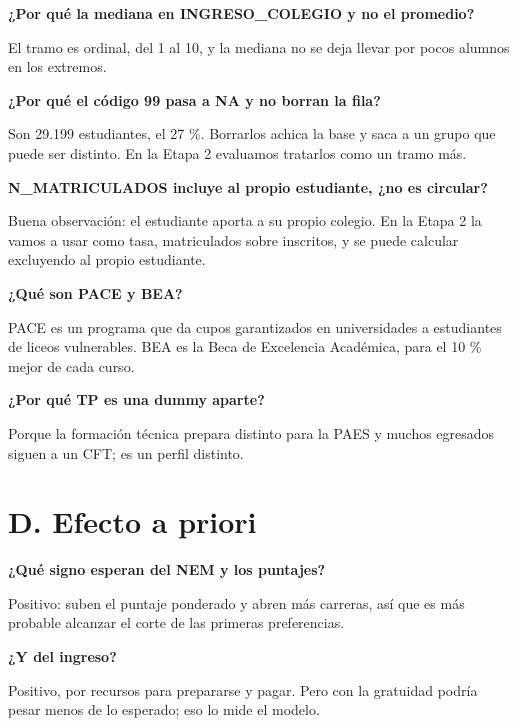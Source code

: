 \documentclass[11pt]{article}
\begin{document}
\textbf{¿Por qué la mediana en INGRESO\_COLEGIO y no el promedio?}\par
\begin{guion}El tramo es ordinal, del 1 al 10, y la mediana no se deja llevar por pocos alumnos en los extremos.\end{guion}

\textbf{¿Por qué el código 99 pasa a NA y no borran la fila?}\par
\begin{guion}Son 29.199 estudiantes, el 27 \%. Borrarlos achica la base y saca a un grupo que puede ser distinto. En la Etapa 2 evaluamos tratarlos como un tramo más.\end{guion}

\textbf{N\_MATRICULADOS incluye al propio estudiante, ¿no es circular?}\par
\begin{guion}Buena observación: el estudiante aporta a su propio colegio. En la Etapa 2 la vamos a usar como tasa, matriculados sobre inscritos, y se puede calcular excluyendo al propio estudiante.\end{guion}

\textbf{¿Qué son PACE y BEA?}\par
\begin{guion}PACE es un programa que da cupos garantizados en universidades a estudiantes de liceos vulnerables. BEA es la Beca de Excelencia Académica, para el 10 \% mejor de cada curso.\end{guion}

\textbf{¿Por qué TP es una dummy aparte?}\par
\begin{guion}Porque la formación técnica prepara distinto para la PAES y muchos egresados siguen a un CFT; es un perfil distinto.\end{guion}

\section*{D. Efecto a priori}

\textbf{¿Qué signo esperan del NEM y los puntajes?}\par
\begin{guion}Positivo: suben el puntaje ponderado y abren más carreras, así que es más probable alcanzar el corte de las primeras preferencias.\end{guion}

\textbf{¿Y del ingreso?}\par
\begin{guion}Positivo, por recursos para prepararse y pagar. Pero con la gratuidad podría pesar menos de lo esperado; eso lo mide el modelo.\end{guion}
\end{document}
